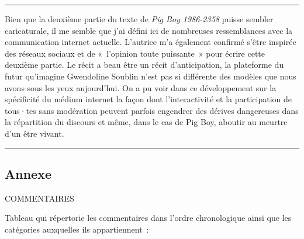 \documentclass[
]{article}
\begin{document}
\begin{center}\rule{0.5\linewidth}{0.5pt}\end{center}

Bien que la deuxième partie du texte de \emph{Pig Boy 1986-2358} puisse sembler caricaturale, il me semble que j'ai défini ici de nombreuses ressemblances avec la communication internet actuelle. L'autrice m'a également confirmé s'être inspirée des réseaux sociaux et de «~l'opinion toute puissante~» pour écrire cette deuxième partie. Le récit a beau être un récit d'anticipation, la plateforme du futur qu'imagine Gwendoline Soublin n'est pas si différente des modèles que nous avons sous les yeux aujourd'hui. On a pu voir dans ce développement sur la spécificité du médium internet la façon dont l'interactivité et la participation de tous·tes sans modération peuvent parfois engendrer des dérives dangereuses dans la répartition du discours et même, dans le cas de Pig Boy, aboutir au meurtre d'un être vivant.

\begin{center}\rule{0.5\linewidth}{0.5pt}\end{center}

\subsection*{Annexe}\label{annexe-1}

COMMENTAIRES

Tableau qui répertorie les commentaires dans l'ordre chronologique ainsi que les catégories auxquelles ils appartiennent~:
\end{document}

